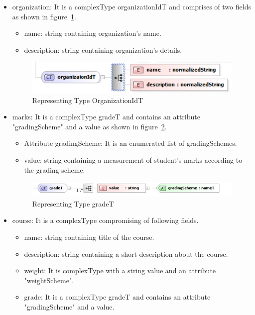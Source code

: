 \documentclass[12pt,a4paper,oneside]{book}
\begin{document}
\begin{itemize}
\item organization: It is a complexType organizationIdT and comprises of two fields as shown in figure~\ref{fig:schema_organizationIdT}.

	 \begin{itemize}
	 	\item name: string containing organization's name.
	 	\item description: string containing organization's details.
	 \end{itemize}

\begin{figure}[!htp]
  \centering
  \includegraphics[width=14cm]{schema_organizationIdT.png}
  \caption{Representing Type OrganizationIdT}
  \label{fig:schema_organizationIdT}
\end{figure}

\item marks: It is a complexType gradeT and contains an attribute "gradingScheme" and a value as shown in figure~\ref{fig:schema_gradeT}.

	 \begin{itemize}
	 	\item Attribute gradingScheme: It is an enumerated list of gradingSchemes.
	 	\item value: string containing a measurement of student's marks according to the grading scheme.
	 \end{itemize}

\begin{figure}[!htp]
  \centering
  \includegraphics[width=14cm]{schema_gradeT.png}
  \caption{Representing Type gradeT}
  \label{fig:schema_gradeT}
\end{figure}

\item course: It is a complexType compromising of following fields.
	\begin{itemize}
	 	\item name: string containing title of the course.
	 	\item description: string containing a short description about the course.
	 	\item weight: It is complexType with a string value and an attribute "weightScheme".
	 	\item grade: It is a complexType gradeT and contains an attribute "gradingScheme" and a value.
	 \end{itemize}


\end{itemize}
\end{document}
